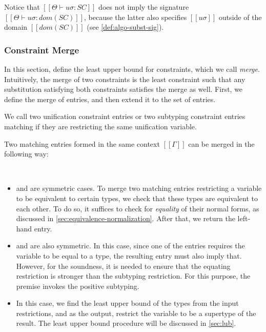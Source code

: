 \documentclass[acmsmall,natbib=false,review,anonymous]{acmart}
\begin{document}
Notice that $[[Θ ⊢ uσ : SC]]$ does not 
imply the signature $[[Θ ⊢ uσ : dom(SC)]]$, because 
the latter also specifies $[[uσ]]$ outside of the domain $[[dom(SC)]]$
(see \cref{def:algo-subst-sig}).


\subsubsection{Constraint Merge}
\label{sec:constraint-merge}

In this section, define the least upper bound 
for constraints, which we call \emph{merge}.
Intuitively, the merge of two constraints is the least
constraint such that any substitution satisfying both constraints
satisfies the merge as well.
First, we define the merge of entries,
and then extend it to the set of entries.

\begin{definition} 
  We call two unification constraint entries 
  or two subtyping constraint entries matching 
  if they are restricting the same unification variable.
\end{definition}

Two matching entries formed in the same context $[[Γ]]$ 
can be merged in the following way:
\begin{algorithm}
  \label{definition:merge-matching-entries}
   \hfill 

  \ottdefnSCMELabeled\\
\end{algorithm}

\begin{itemize}
  \item {} and 
    are symmetric cases. To merge two matching entries restricting
    a variable to be equivalent to certain types, we check
    that these types are equivalent to each other.
    To do so, it suffices to check for \emph{equality} of their normal forms,
    as discussed in \cref{sec:equivalence-normalization}. 
    After that, we return the left-hand entry.

  \item {} and 
    are also symmetric. 
    In this case,
    since one of the entries requires the variable to be equal to 
    a type, the resulting entry must also imply that.
    However, for the soundness, it is needed to ensure that
    the equating restriction is stronger than the subtyping restriction.
    For this purpose, the premise invokes the positive subtyping.

  \item {} 
    In this case, we find the least upper bound of the types from the input
    restrictions, 
    and as the output, restrict the variable to be a supertype of the result.
    The least upper bound procedure will be discussed in \cref{sec:lub}.
\end{itemize}
\end{document}
